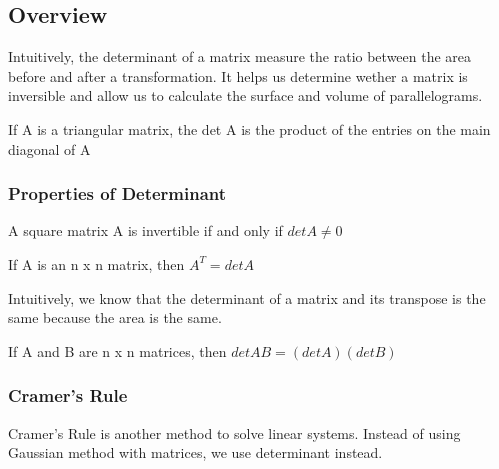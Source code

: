 \documentclass{article}
\begin{document}
\subsection{Overview}

Intuitively, the determinant of a matrix measure the ratio between the area before
and after a transformation. It helps us determine wether a matrix is inversible
and allow us to calculate the surface and volume of parallelograms.

\begin{definition}[Determinant]
\end{definition}

\begin{theorem}
    If A is a triangular matrix, the det A is the product of the entries on the
    main diagonal of A
\end{theorem}

\subsubsection{Properties of Determinant}

\begin{theorem}
\end{theorem}

\begin{theorem}
    A square matrix A is invertible if and only if $det A \neq 0$
\end{theorem}

\begin{theorem}
    If A is an n x n matrix, then $A^T = det A$
\end{theorem}

\begin{remark}
    Intuitively, we know that the determinant of a matrix and its transpose
    is the same because the area is the same.
\end{remark}

\begin{theorem}
    If A and B are n x n matrices, then $det AB = (det A)(det B)$
\end{theorem}

\subsubsection{Cramer's Rule}

Cramer's Rule is another method to solve linear systems. Instead of using
Gaussian method with matrices, we use determinant instead.
\end{document}

